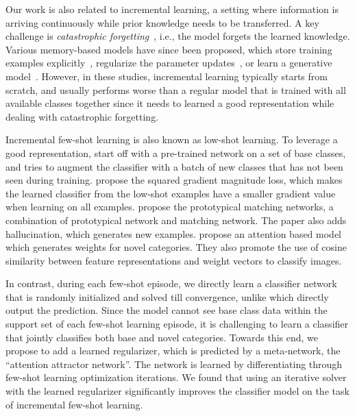 Our work is also related to incremental learning, a setting where information is arriving
continuously while prior knowledge needs to be transferred. A key challenge is \textit{catastrophic
forgetting}~\citep{mccloskey1989catastrophic,mcclelland1995there}, i.e., the model forgets the
learned knowledge. Various memory-based models have since been proposed, which store training
examples explicitly~\citep{icarl,mbpa,castro2018end,varcontinual}, regularize the parameter 
updates~\citep{kirkpatrick2017overcoming}, or learn a generative model~\citep{fearnet}. However, in these
studies, incremental learning typically starts from scratch, and usually performs worse than a
regular model that is trained with all available classes together since it needs to learned a good
representation while dealing with catastrophic forgetting.

Incremental few-shot learning is also known as low-shot learning. To leverage a good representation,
\citet{hariharan2017lowshot,wang2018lowshot,lwof} start off with a pre-trained network on a set of
base classes, and tries to augment the classifier with a batch of new classes that has not been seen
during training. \citet{hariharan2017lowshot} propose the squared gradient magnitude loss, which
makes the learned classifier from the low-shot examples have a smaller gradient value when learning
on all examples. \citet{wang2018lowshot} propose the prototypical matching networks, a combination of
prototypical network and matching network. The paper also adds hallucination, which generates new
examples. \citet{lwof} propose an attention based model which generates weights for novel
categories. They also promote the use of cosine similarity between feature representations and
weight vectors to classify images.

In contrast, during each few-shot episode, we directly learn a classifier network that is randomly
initialized and solved till convergence, unlike \citet{lwof} which directly output the prediction.
Since the model cannot see base class data within the support set of each few-shot learning episode,
it is challenging to learn a classifier that jointly classifies both base and novel categories.
Towards this end, we propose to add a learned regularizer, which is predicted by a meta-network, the
``attention attractor network''. The network is learned by differentiating through few-shot learning
optimization iterations. We found that using an iterative solver with the learned regularizer
significantly improves the classifier model on the task of incremental few-shot learning.